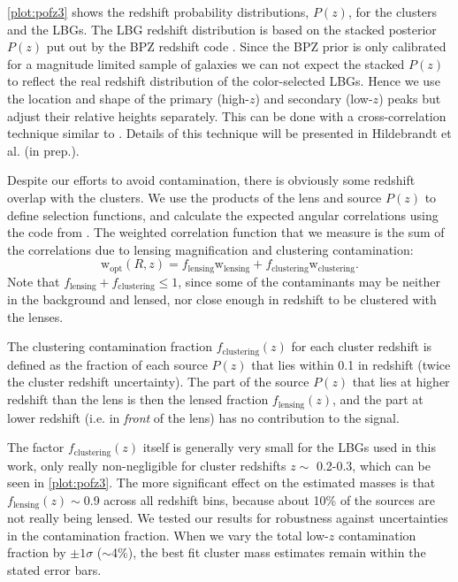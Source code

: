 \autoref{plot:pofz3} shows the redshift probability distributions, $P(z)$, for the clusters and the \ac{LBG}s. The \ac{LBG} redshift distribution is based on the stacked posterior $P(z)$ put out by the BPZ redshift code \citep[for details on the \ac{CFHTLenS} photo-$z$ see][]{Hildebrandt12}. Since the BPZ prior is only calibrated for a magnitude limited sample of galaxies we can not expect the stacked $P(z)$ to reflect the real redshift distribution of the color-selected \ac{LBG}s. Hence we use the location and shape of the primary (high-$z$) and secondary (low-$z$) peaks but adjust their relative heights separately. This can be done with a cross-correlation technique similar to \citet{Newman08}. Details of this technique will be presented in Hildebrandt et al. (in prep.).

Despite our efforts to avoid contamination, there is obviously some redshift overlap with the clusters. We use the products of the lens and source $P(z)$ to define selection functions, and calculate the expected angular correlations using the code from \citet{Hamana04}. The weighted correlation function that we measure is the sum of the correlations due to lensing magnification and clustering contamination:
\begin{equation}
\mathrm{w}_{\mathrm{opt}}(R,z) = f_{\mathrm{lensing}}\mathrm{w}_{\mathrm{lensing}} + f_{\mathrm{clustering}}\mathrm{w}_{\mathrm{clustering}}.
\end{equation}
Note that $f_{\mathrm{lensing}}+f_{\mathrm{clustering}} \leq 1$, since some of the contaminants may be neither in the background and lensed, nor close enough in redshift to be clustered with the lenses.

The clustering contamination fraction $f_{\mathrm{clustering}}(z)$ for each cluster redshift is defined as the fraction of each source $P(z)$ that lies within 0.1 in redshift (twice the cluster redshift uncertainty). The part of the source $P(z)$ that lies at higher redshift than the lens is then the lensed fraction $f_{\mathrm{lensing}}(z)$, and the part at lower redshift (i.e. in {\it front} of the lens) has no contribution to the signal.

The factor $f_{\mathrm{clustering}}(z)$ itself is generally very small for the \ac{LBG}s used in this work, only really non-negligible for cluster redshifts $z \sim$ 0.2-0.3, which can be seen in \autoref{plot:pofz3}. The more significant effect on the estimated masses is that $f_{\mathrm{lensing}}(z) \sim$0.9 across all redshift bins, because about 10\% of the sources are not really being lensed. We tested our results for robustness against uncertainties in the contamination fraction. When we vary the total low-$z$ contamination fraction by $\pm1\sigma$ ($\sim$4\%), the best fit cluster mass estimates remain within the stated error bars.


